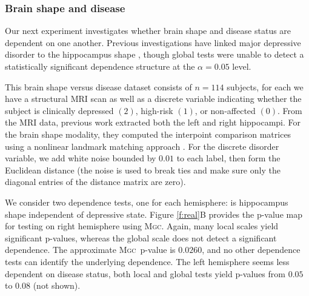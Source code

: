 \documentclass[11pt]{article}
\newcommand{\note}[2][]{\added[#1,remark={#2}]{}}
\providecommand{\sct}[1]{{\normalfont\textsc{#1}}}
\newcommand{\Mgc}{\sct{Mgc}}
\newcommand{\Hhg}{\sct{Hhg}}
\newcommand{\Dcorr}{\sct{Dcorr}}
\newcommand{\Mcorr}{\sct{Mcorr}}
\newcommand{\Mantel}{\sct{Mantel}}
\newcommand{\jv}[1]{{\note{jv: #1}}}
\newcommand{\cs}[1]{{\note{cs: #1}}}
\begin{document}
\subsubsection*{Brain shape and disease} %


Our next experiment investigates whether brain shape and disease status are dependent on one another.  Previous investigations have linked major depressive disorder to the hippocampus shape \cite{ParkEtAl2008,PosenerEtAl2003}, though global tests were unable to detect a statistically significant dependence structure at the $\alpha=0.05$ level.



This brain shape versus disease dataset consists of $n=114$ subjects, for each we have a structural MRI scan as well as a discrete variable indicating whether the subject is clinically depressed $(2)$, high-risk $(1)$, or non-affected $(0)$.  From the MRI data, previous work  extracted both the left and right hippocampi.   For the brain shape modality, they computed the interpoint comparison matrices using a nonlinear landmark matching approach \cite{ParkEtAl2008,BegEtAl2005}. For the discrete disorder variable, we add white noise bounded by $0.01$ to each label, then form the Euclidean distance (the noise is used to break ties and make sure only the diagonal entries of the distance matrix are zero).
\cs{i don't understand the justification for this. why not add 1 everywhere but diagonals like you did before?}

We consider two dependence tests, one for each hemisphere: is hippocampus shape independent of depressive state.
Figure \ref{f:real}B provides the p-value map for testing on right hemisphere using \Mgc. Again, many local scales yield significant p-values, whereas the global scale does not detect a significant dependence. The approximate \Mgc~p-value is $0.0260$, and no other dependence tests can identify the underlying  dependence. The left hemisphere seems less dependent on disease status, 
both local and global tests yield  p-values from $0.05$ to $0.08$ (not shown). 
\jv{let's check whether anybody knew that?}
\end{document}
